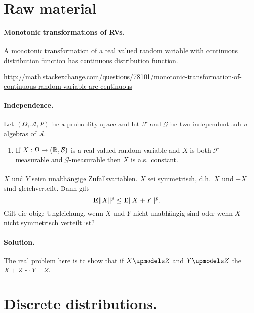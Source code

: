 
\section{Raw material}


\paragraph{Monotonic transformations of RVs.} A monotonic transformation of
a real valued random variable with continuous distribution function has
continuous distribution function. 

\url{http://math.stackexchange.com/questions/78101/monotonic-transformation-of-continuous-random-variable-are-continuous}



\paragraph{Independence. }
Let $(\Omega, \mathcal A, P)$ be a probablity space and let $\mathcal F$ and
$\mathcal G$ be two independent sub-$\sigma$-algebras of $\mathcal A$.

\begin{enumerate} 
\item If $X: \Omega \to (\mathbb R, \mathcal B)$ is a
    real-valued random variable and $X$ is both $\mathcal F$-measurable
    and $\mathcal G$-measurable then $X$ is a.s.~constant.
\end{enumerate}
\paragraph{} $X$ und $Y$ seien unabhängige Zufallsvariablen. $X$ sei symmetrisch, 
d.h.\ $X$ und $-X$ sind gleichverteilt. Dann gilt
\begin{equation}
    \mathbf{E} \| X \|^p \leq \mathbf{E} \| X + Y \|^p.
\end{equation}
Gilt die obige Ungleichung, wenn $X$ und $Y$ nicht unabhängig sind oder wenn 
$X$ nicht symmetrisch verteilt ist?

\paragraph*{Solution. } The real problem here is to show that if $X \upmodels Z$
and $Y \upmodels Z$ the $X+Z \sim Y+Z$. 


\section{Discrete distributions.}

